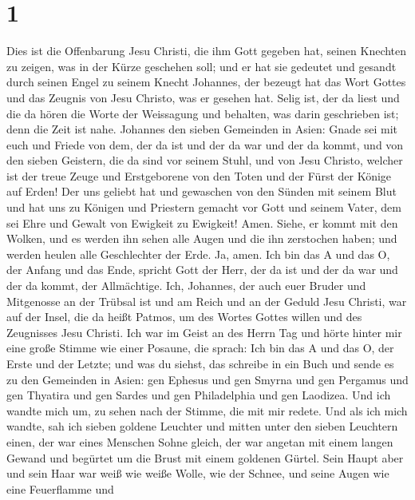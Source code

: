 \hypertarget{section}{%
\section{1}\label{section}}

 Dies ist die Offenbarung Jesu Christi, die ihm Gott gegeben
hat, seinen Knechten zu zeigen, was in der Kürze geschehen soll; und er
hat sie gedeutet und gesandt durch seinen Engel zu seinem Knecht
Johannes,  der bezeugt hat das Wort Gottes und das Zeugnis
von Jesu Christo, was er gesehen hat.  Selig ist, der da
liest und die da hören die Worte der Weissagung und behalten, was darin
geschrieben ist; denn die Zeit ist nahe.  Johannes den
sieben Gemeinden in Asien: Gnade sei mit euch und Friede von dem, der da
ist und der da war und der da kommt, und von den sieben Geistern, die da
sind vor seinem Stuhl,  und von Jesu Christo, welcher ist
der treue Zeuge und Erstgeborene von den Toten und der Fürst der Könige
auf Erden! Der uns geliebt hat und gewaschen von den Sünden mit seinem
Blut  und hat uns zu Königen und Priestern gemacht vor Gott
und seinem Vater, dem sei Ehre und Gewalt von Ewigkeit zu Ewigkeit!
Amen.  Siehe, er kommt mit den Wolken, und es werden ihn
sehen alle Augen und die ihn zerstochen haben; und werden heulen alle
Geschlechter der Erde. Ja, amen.  Ich bin das A und das O,
der Anfang und das Ende, spricht Gott der Herr, der da ist und der da
war und der da kommt, der Allmächtige.  Ich, Johannes, der
auch euer Bruder und Mitgenosse an der Trübsal ist und am Reich und an
der Geduld Jesu Christi, war auf der Insel, die da heißt Patmos, um des
Wortes Gottes willen und des Zeugnisses Jesu Christi.  Ich
war im Geist an des Herrn Tag und hörte hinter mir eine große Stimme wie
einer Posaune,  die sprach: Ich bin das A und das O, der
Erste und der Letzte; und was du siehst, das schreibe in ein Buch und
sende es zu den Gemeinden in Asien: gen Ephesus und gen Smyrna und gen
Pergamus und gen Thyatira und gen Sardes und gen Philadelphia und gen
Laodizea.  Und ich wandte mich um, zu sehen nach der
Stimme, die mit mir redete. Und als ich mich wandte, sah ich sieben
goldene Leuchter  und mitten unter den sieben Leuchtern
einen, der war eines Menschen Sohne gleich, der war angetan mit einem
langen Gewand und begürtet um die Brust mit einem goldenen Gürtel.
 Sein Haupt aber und sein Haar war weiß wie weiße Wolle,
wie der Schnee, und seine Augen wie eine Feuerflamme  und
